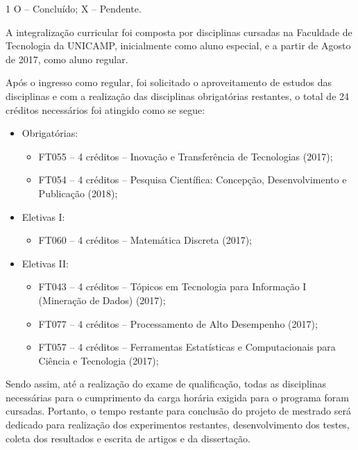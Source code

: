 \begin{table}[!htp]
\begin{threeparttable}[b]
\begin{tabular}{|p{3.1cm}|c|c|c|c|c|c|c|c|c|c|c|c|c|}
\end{tabular}
\begin{tablenotes}
\item[1]O -- Concluído; X -- Pendente.
\end{tablenotes}
\end{threeparttable}
\end{table}

A integralização curricular foi composta por disciplinas cursadas na Faculdade de Tecnologia da UNICAMP, inicialmente como aluno especial, e a partir de Agosto de 2017, como aluno regular.

Após o ingresso como regular, foi solicitado o aproveitamento de estudos das disciplinas e com a realização das disciplinas obrigatórias restantes, o total de 24 créditos necessários foi atingido como se segue:

\begin{itemize}
\item Obrigatórias:
\begin{itemize}
\item FT055 -- 4 créditos -- Inovação e Transferência de Tecnologias (2017);
\item FT054 -- 4 créditos -- Pesquisa Científica: Concepção, Desenvolvimento e Publicação (2018);
\end{itemize}
\item Eletivas I:
\begin{itemize}
\item FT060 -- 4 créditos -- Matemática Discreta (2017);
\end{itemize}
\item Eletivas II:
\begin{itemize}
\item FT043 -- 4 créditos -- Tópicos em Tecnologia para Informação I (Mineração de Dados) (2017);
\item FT077 -- 4 créditos -- Processamento de Alto Desempenho (2017);
\item FT057 -- 4 créditos -- Ferramentas Estatísticas e Computacionais para Ciência e Tecnologia (2017);
\end{itemize}
\end{itemize}

Sendo assim, até a realização do exame de qualificação, todas as disciplinas necessárias para o cumprimento da carga horária exigida para o programa foram cursadas. Portanto, o tempo restante para conclusão do projeto de mestrado será dedicado para realização dos experimentos restantes, desenvolvimento dos testes, coleta dos resultados e escrita de artigos e da dissertação.

